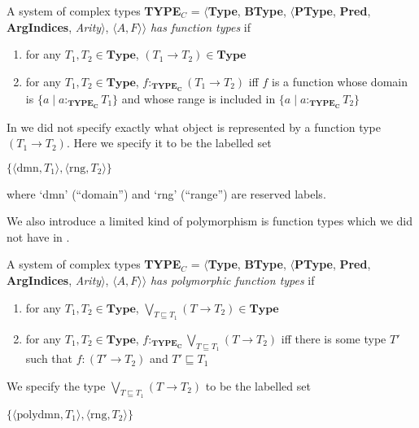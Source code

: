 A system of complex types {\bf TYPE$_C$} = $\langle${\bf Type}, {\bf BType},
$\langle$\textbf{PType}, {\bf Pred}, \textbf{ArgIndices}, {\it Arity\/}$\rangle$, $\langle A,F\rangle$$\rangle$ \textit{has function types} if
\begin{enumerate} 
 
\item for any $T_1,T_2 \in \textbf{Type}$, $(T_1\rightarrow T_2) \in \textbf{Type}$ 
 
\item for any $T_1,T_2 \in \textbf{Type}$, $f:_{\mathbf{TYPE_C}}(T_1\rightarrow T_2)$ iff
  $f$ is a function whose domain is $\{a\mid
  a:_{\mathbf{TYPE_C}}T_1\}$ and whose range is included in $\{a\mid a:_{\mathbf{TYPE_C}}T_2\}$ 
 
\end{enumerate}

In \cite{Cooper2012} we did not specify exactly what object is
represented by a function type $(T_1\rightarrow T_2)$.  Here we
specify it to be the labelled set

$\{\langle\mathrm{dmn},T_1\rangle,\langle\mathrm{rng},T_2\rangle\}$

where `dmn' (``domain'') and `rng' (``range'') are reserved labels.

We also introduce a limited kind of polymorphism is function types
which we did not have in \cite{Cooper2012}.


A system of complex types {\bf TYPE$_C$} = $\langle${\bf Type}, {\bf BType},
$\langle$\textbf{PType}, {\bf Pred}, \textbf{ArgIndices}, {\it
  Arity\/}$\rangle$, $\langle A,F\rangle$$\rangle$ \textit{has
  polymorphic function types} if
\begin{enumerate} 
 
\item for any $T_1,T_2 \in \textbf{Type}$,
  $\displaystyle{\bigvee_{T\sqsubseteq T_1}}(T\rightarrow T_2) \in \textbf{Type}$ 
 
\item for any $T_1,T_2 \in \textbf{Type}$,
  $f:_{\mathbf{TYPE_C}}\displaystyle{\bigvee_{T\sqsubseteq
      T_1}}(T\rightarrow T_2)$ iff there is some type $T'$ such that
  $f:(T'\rightarrow T_2)$ and $T'\sqsubseteq T_1$
   
 
\end{enumerate}

We
specify the type $\displaystyle{\bigvee_{T\sqsubseteq T_1}}(T\rightarrow T_2)$   to be the labelled set

$\{\langle\mathrm{polydmn},T_1\rangle,\langle\mathrm{rng},T_2\rangle\}$


